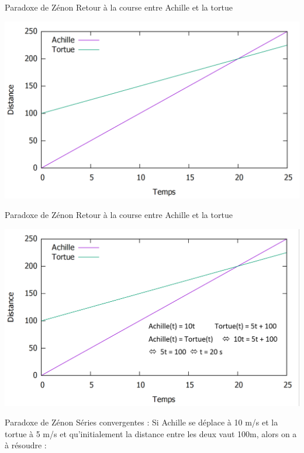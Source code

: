 \documentclass[usenames, dvipsnames]{beamer}
\begin{document}
\begin{frame}[plain]{Paradoxe de Zénon}
Retour à la course entre Achille et la tortue 
\pause
\begin{center}
\includegraphics[scale=0.35]{images/ZAPT2.png}
\end{center}
\end{frame}



\begin{frame}[plain]{Paradoxe de Zénon}
Retour à la course entre Achille et la tortue
\begin{center}
\includegraphics[scale=0.35]{images/ZAPT3.png}
\end{center}
\end{frame}




\begin{frame}[plain]{Paradoxe de Zénon}
{Séries convergentes :}
Si Achille se déplace à 10 m/s et la tortue à 5 m/s et qu'initialement la distance entre les deux vaut 100m, alors on a à résoudre : 
{} %
{}
\end{frame}
\end{document}
